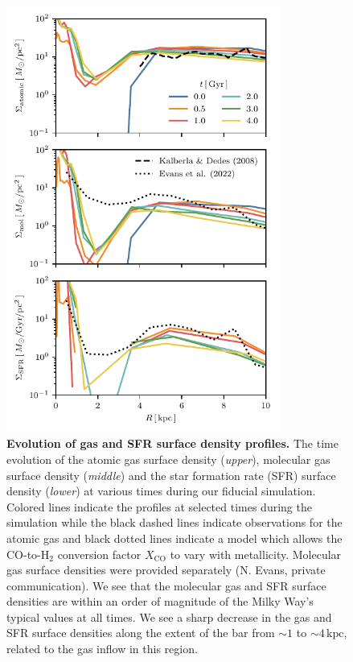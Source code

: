 \documentclass[twoside]{natureprintstyle}
\begin{document}
\begin{figure}[t!]%
\centering
\includegraphics[width=9cm]{fig/surf_dens.pdf}
\caption{\textbf{Evolution of gas and SFR surface density profiles.} The time
evolution of the atomic gas surface density (\textit{upper}), molecular gas
surface density (\textit{middle}) and the star formation rate (SFR) surface
density (\textit{lower}) at various times during our fiducial simulation.
Colored lines indicate the profiles at selected times during the simulation
while the black dashed lines indicate observations for the atomic
gas\cite{2008AA...487..951K} and black dotted lines indicate a model which
allows the CO-to-H$_2$ conversion factor $X_{\textrm{CO}}$ to vary with
metallicity.\cite{2022ApJ...929L..18E} Molecular gas surface densities were
provided separately (N. Evans, private communication). We see that the
molecular gas and SFR surface densities are within an order of magnitude of
the Milky Way's typical values at all times.  We see a sharp decrease in the
gas and SFR surface densities along the extent of the bar from $\sim1$ to
$\sim4\,\textrm{kpc}$, related to the gas inflow in this region.}
\label{fig:surf}
\end{figure}

\vspace{12pt}
\end{document}
